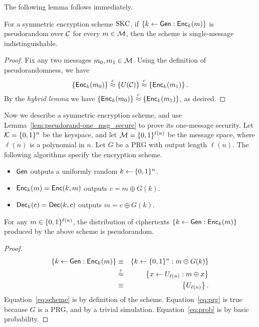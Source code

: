 \documentclass[11pt]{article}
\begin{document}
The following lemma follows immediately. 

\begin{lemma}
  \label{lem:pseudorand-one_msg_secure}
  For a symmetric encryption scheme $\text{SKC}$, if $\{k \gets \mathsf{Gen} :
    \mathsf{Enc}_k(m)\}$ is pseudorandom over $\mathcal{C}$ for every $m \in
  \mathcal{M}$, then the scheme is single-message indistinguishable.
\end{lemma}

\begin{proof}
  Fix any two messages $m_0, m_1 \in \mathcal{M}$.  Using the definition
  of pseudorandomness, we have
  \[ \left\{ \mathsf{Enc}_k(m_0) \right\} \stackrel{c}{\approx} \left\{ U(\mathcal{C})
  \right\} \stackrel{c}{\approx} \left\{ \mathsf{Enc}_k(m_1) \right\}. \] By the
  \emph{hybrid lemma} we have $ \left\{ \mathsf{Enc}_k(m_0) \right\}
  \stackrel{c}{\approx} \left\{ \mathsf{Enc}_k(m_1) \right\}$, as desired.
\end{proof}

Now we describe a symmetric encryption scheme, and use
Lemma~\ref{lem:pseudorand-one_msg_secure} to prove its one-message
security.  Let $\mathcal{K} = \{0,1\}^n$ be the keyspace, and let
$\mathcal{M} = \{0,1\}^{\ell(n)}$ be the message space, where $\ell(n)$ is
a polynomial in $n$.  Let $G$ be a PRG with output length $\ell(n)$.
The following algorithms specify the encryption scheme.
\begin{itemize}
\item $\mathsf{Gen}$ outputs a uniformly random $k \gets \{0,1\}^{n}$.
\item $\mathsf{Enc}_k(m) = \mathsf{Enc}(k,m)$ outputs $c = m \oplus G(k)$.
\item $\mathsf{Dec}_k(c) = \mathsf{Dec}(k, c)$ outputs $m = c \oplus G(k)$.
\end{itemize}

\begin{claim}
  For any $m \in \{0,1\}^{\ell(n)}$, the distribution of ciphertexts
  $\left\{ k \gets \mathsf{Gen} : \mathsf{Enc}_k(m) \right\}$ produced by the
  above scheme is pseudorandom.
\end{claim}

\begin{proof}
  \begin{eqnarray}
    \left\{ k \gets \mathsf{Gen} : \mathsf{Enc}_k(m) \right\} & \equiv &
    \left\{ k \gets \{0,1\}^{n} : m \oplus G(k) \right\} \label{eq:scheme} \\
    & \stackrel{c}{\approx} & \left\{ x \gets U_{\ell(n)} : m \oplus x
    \right\} \label{eq:prg} \\
    & \equiv & \left\{ U_{\ell(n)} \right\}. \label{eq:prob}
  \end{eqnarray}
  Equation~\eqref{eq:scheme} is by definition of the scheme.
  Equation~\eqref{eq:prg} is true because $G$ is a PRG, and by a
  trivial simulation.  Equation~\eqref{eq:prob} is by basic
  probability.
\end{proof}
\end{document}
